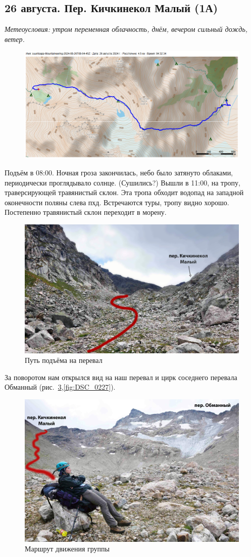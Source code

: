\subsection{26 августа. Пер. Кичкинекол Малый (1А)}
\textit{Метеоусловия: утром переменная облачность, днём, вечером сильный дождь, ветер.}

\begin{figure}[h!]
	\centering
	\includegraphics[angle=0, width=0.7\linewidth]{../pics/mini_maps/26}
	\label{fig:mini_26}
\end{figure}

Подъём в 08:00. Ночная гроза закончилась, небо было затянуто облаками, периодически проглядывало солнце. \alert{(Сушились?)} Вышли в 11:00, на тропу, траверсирующей травянистый склон. Эта тропа обходит водопад на западной оконечности поляны слева пхд. Встречаются туры, тропу видно хорошо. 
Постепенно травянистый склон переходит в морену.

\begin{figure}[h!]
	\centering
	\includegraphics[width=0.7\linewidth]{../pics/DSC_0221.JPG}
	\caption{Путь подъёма на перевал}
	\label{fig:DSC_0221}
\end{figure}
 
За поворотом нам открылся вид на наш перевал и цирк соседнего перевала Обманный (рис.~\ref{fig:DSC_0226},\ref{fig:DSC_0227}).
 
\begin{figure}[h!]
	\centering
	\includegraphics[width=0.7\linewidth]{../pics/DSC_0226}
	\caption{Маршрут движения группы}
	\label{fig:DSC_0226}
\end{figure}

